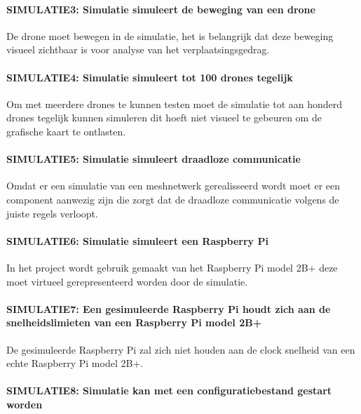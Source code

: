 \documentclass[a4paper, 11pt, oneside]{report}
\begin{document}
\paragraph{SIMULATIE3: Simulatie simuleert de beweging van een drone}
\hypertarget{SIMULATIE3}{}

De drone moet bewegen in de simulatie, het is belangrijk dat deze beweging visueel zichtbaar is voor analyse van het verplaatsingsgedrag.

\paragraph{SIMULATIE4: Simulatie simuleert tot 100 drones tegelijk}
\hypertarget{SIMULATIE4}{}

Om met meerdere drones te kunnen testen moet de simulatie tot aan honderd drones tegelijk kunnen simuleren dit hoeft niet visueel te gebeuren om de grafische kaart te ontlasten.

\paragraph{SIMULATIE5: Simulatie simuleert draadloze communicatie}
\hypertarget{SIMULATIE5}{}

Omdat er een simulatie van een meshnetwerk gerealisseerd wordt moet er een component aanwezig zijn die zorgt dat de draadloze communicatie volgens de juiste regels verloopt.

\paragraph{SIMULATIE6: Simulatie simuleert een Raspberry Pi}
\hypertarget{SIMULATIE6}{}

In het project wordt gebruik gemaakt van het Raspberry Pi model 2B+ deze moet virtueel gerepresenteerd worden door de simulatie.

\paragraph{SIMULATIE7: Een gesimuleerde Raspberry Pi houdt zich aan de snelheidslimieten van een Raspberry Pi model 2B+}
\hypertarget{SIMULATIE7}{}

De gesimuleerde Raspberry Pi zal zich niet houden aan de clock snelheid van een echte Raspberry Pi model 2B+.

\paragraph{SIMULATIE8: Simulatie kan met een configuratiebestand gestart worden}
\hypertarget{SIMULATIE8}{}
\end{document}
